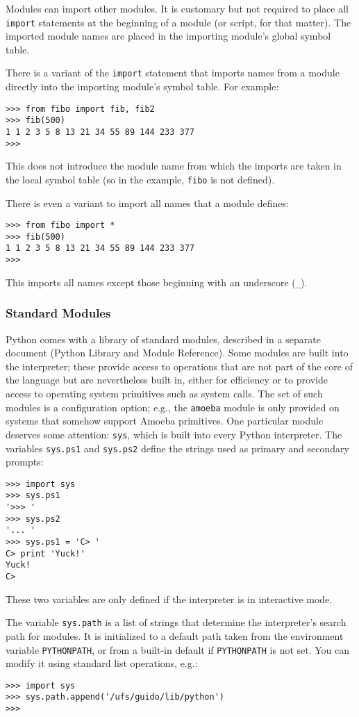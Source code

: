 Modules can import other modules.
It is customary but not required to place all
{\tt import}
statements at the beginning of a module (or script, for that matter).
The imported module names are placed in the importing module's global
symbol table.

There is a variant of the
{\tt import}
statement that imports names from a module directly into the importing
module's symbol table.
For example:
\bcode\begin{verbatim}
>>> from fibo import fib, fib2
>>> fib(500)
1 1 2 3 5 8 13 21 34 55 89 144 233 377
>>> 
\end{verbatim}\ecode
This does not introduce the module name from which the imports are taken
in the local symbol table (so in the example, {\tt fibo} is not
defined).

There is even a variant to import all names that a module defines:
\bcode\begin{verbatim}
>>> from fibo import *
>>> fib(500)
1 1 2 3 5 8 13 21 34 55 89 144 233 377
>>> 
\end{verbatim}\ecode
This imports all names except those beginning with an underscore
({\tt \_}).

\subsubsection{Standard Modules}

Python comes with a library of standard modules, described in a separate
document (Python Library and Module Reference).
Some modules are built into the interpreter; these provide access to
operations that are not part of the core of the language but are
nevertheless built in, either for efficiency or to provide access to
operating system primitives such as system calls.
The set of such modules is a configuration option; e.g., the
{\tt amoeba}
module is only provided on systems that somehow support Amoeba
primitives.
One particular module deserves some attention:
{\tt sys},
which is built into every Python interpreter.
The variables
{\tt sys.ps1}
and
{\tt sys.ps2}
define the strings used as primary and secondary prompts:
\bcode\begin{verbatim}
>>> import sys
>>> sys.ps1
'>>> '
>>> sys.ps2
'... '
>>> sys.ps1 = 'C> '
C> print 'Yuck!'
Yuck!
C> 
\end{verbatim}\ecode
These two variables are only defined if the interpreter is in
interactive mode.

The variable
{\tt sys.path}
is a list of strings that determine the interpreter's search path for
modules.
It is initialized to a default path taken from the environment variable
{\tt PYTHONPATH},
or from a built-in default if
{\tt PYTHONPATH}
is not set.
You can modify it using standard list operations, e.g.:
\bcode\begin{verbatim}
>>> import sys
>>> sys.path.append('/ufs/guido/lib/python')
>>> 
\end{verbatim}\ecode

